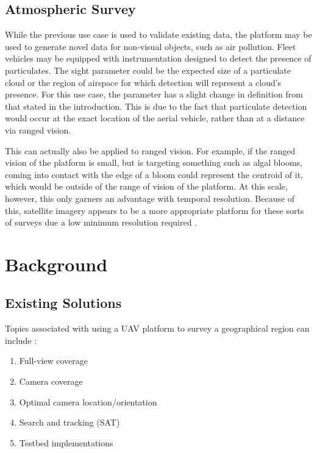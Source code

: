 \documentclass[conf]{new-aiaa}
\begin{document}
\subsection{Atmospheric Survey}
While the previous use case is used to validate existing data, the platform may be used to generate novel data for non-visual objects, such as air pollution. Fleet vehicles may be equipped with instrumentation designed to detect the presence of particulates. The sight parameter could be the expected size of a particulate cloud or the region of airspace for which detection will represent a cloud's presence. For this use case, the parameter has a slight change in definition from that stated in the introduction. This is due to the fact that particulate detection would occur at the exact location of the aerial vehicle, rather than at a distance via ranged vision. 

This can actually also be applied to ranged vision. For example, if the ranged vision of the platform is small, but is targeting something such as algal blooms, coming into contact with the edge of a bloom could represent the centroid of it, which would be outside of the range of vision of the platform. At this scale, however, this only garners an advantage with temporal resolution. Because of this, satellite imagery appears to be a more appropriate platform for these sorts of surveys due a low minimum resolution required \cite{algalblooms}.




\section{Background}

\subsection{Existing Solutions}
Topics associated with using a UAV platform to survey a geographical region can include \cite{droneBeGone}:
\begin{enumerate}
\item Full-view coverage
\item Camera coverage
\item Optimal camera location/orientation
\item Search and tracking (SAT)
\item Testbed implementations
\end{enumerate}
\end{document}
